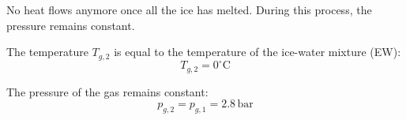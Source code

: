 No heat flows anymore once all the ice has melted. During this process, the pressure remains constant.  

The temperature \( T_{g,2} \) is equal to the temperature of the ice-water mixture (EW):  
\[
T_{g,2} = 0^\circ\text{C}
\]  

The pressure of the gas remains constant:  
\[
p_{g,2} = p_{g,1} = 2.8 \, \text{bar}
\]